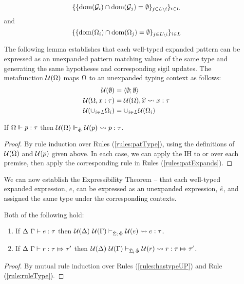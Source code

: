 {{{{\[\{\{\text{dom}(\mathcal{G}_i) \cap \text{dom}(\mathcal{G}_j) = \emptyset\}_{j \in L \setminus i}\}_{i \in L}\]
and
\[\{\{\text{dom}(\Omega_i) \cap \text{dom}(\Omega_j) = \emptyset\}_{j \in L \setminus i}\}_{i \in L}\]

The following lemma establishes that each well-typed expanded pattern can be expressed as an unexpanded pattern matching values of the same type and generating the same hypotheses and corresponding sigil updates. The metafunction $\mathcal{U}(\Omega)$ maps $\Omega$ to an unexpanded typing context as follows:
\begin{align*}
\mathcal{U}(\emptyset) & = \langle \emptyset; \emptyset \rangle\\
\mathcal{U}(\Omega, x : \tau) & = \mathcal{U}(\Omega), \widehat{x} \leadsto x : \tau\\
\mathcal{U}(\cup_{i \in L} \Omega_i) & = \cup_{i \in L} \mathcal{U}(\Omega_i)
\end{align*}
\begin{lemma}\label{lemma:pattern-expressibility} If $\Omega \Vdash p : \tau$ then $\mathcal{U}(\Omega) \Vdash_{\hat\Phi} \mathcal{U}(p) \leadsto p : \tau$.\end{lemma}
\begin{proof} By rule induction over Rules (\ref{rules:patType}), using the definitions of $\mathcal{U}(\Omega)$ and $\mathcal{U}(p)$ given above. In each case, we can apply the IH to or over each premise, then apply the corresponding rule in Rules (\ref{rules:patExpands}).\end{proof}

We can now establish the Expressibility Theorem -- that each well-typed expanded expression, $e$, can be expressed as an unexpanded expression, ${\hat e}$, and assigned the same type under the corresponding contexts.

\begin{theorem}[Expressibility] Both of the following hold:
\begin{enumerate}
\item If $\Delta~\Gamma \vdash e : \tau$ then $\mathcal{U}(\Delta)~\mathcal{U}(\Gamma) \vdash_{\hat{\Sigma};\,\hat\Phi} \mathcal{U}(e) \leadsto e : \tau$.
\item If $\Delta~\Gamma \vdash r : \tau \Mapsto \tau'$ then $\mathcal{U}(\Delta)~\mathcal{U}(\Gamma) \vdash_{\hat{\Sigma};\,\hat\Phi} \mathcal{U}(r) \leadsto r : \tau \Mapsto \tau'$.
\end{enumerate}
\end{theorem}
\begin{proof} By mutual rule induction over Rules (\ref{rules:hastypeUP}) and Rule (\ref{rule:ruleType}). 


\end{proof}}}}}
